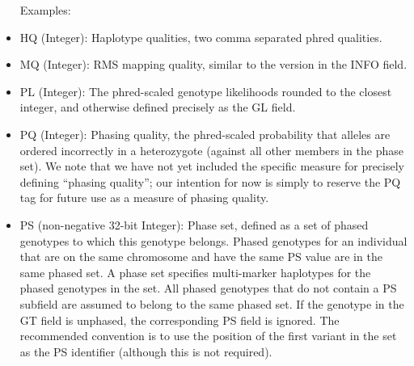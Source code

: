\documentclass[8pt]{article}
\begin{document}
\begin{itemize}
  Examples:

  \item HQ (Integer): Haplotype qualities, two comma separated phred qualities.
  \item MQ (Integer): RMS mapping quality, similar to the version in the INFO field.
  \item PL (Integer): The phred-scaled genotype likelihoods rounded to the closest integer, and otherwise defined precisely as the GL field.
  \item PQ (Integer): Phasing quality, the phred-scaled probability that alleles are ordered incorrectly in a heterozygote (against all other members in the phase set).
  We note that we have not yet included the specific measure for precisely defining ``phasing quality''; our intention for now is simply to reserve the PQ tag for future use as a measure of phasing quality.
  \item PS (non-negative 32-bit Integer): Phase set, defined as a set of phased genotypes to which this genotype belongs.
  Phased genotypes for an individual that are on the same chromosome and have the same PS value are in the same phased set.
  A phase set specifies multi-marker haplotypes for the phased genotypes in the set.
  All phased genotypes that do not contain a PS subfield are assumed to belong to the same phased set.
  If the genotype in the GT field is unphased, the corresponding PS field is ignored.
  The recommended convention is to use the position of the first variant in the set as the PS identifier (although this is not required).
\end{itemize}
\end{document}
